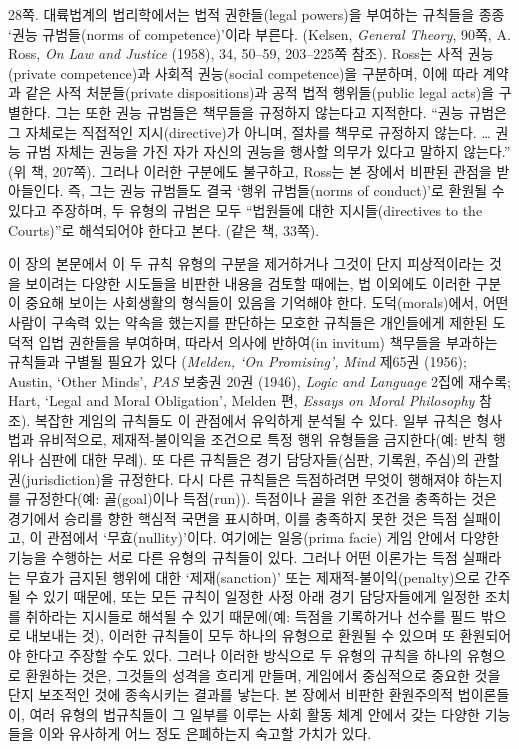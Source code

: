 {\noteentry 28쪽.  대륙법계의
법리학에서는 법적 권한들(legal powers)을 부여하는 규칙들을 종종 ‘권능
규범들(norms of competence)’이라 부른다. (Kelsen, \emph{General Theory},
90쪽, A. Ross, \emph{On Law and Justice} (1958), 34, 50--59, 203--225쪽
참조). Ross는 사적 권능(private competence)과 사회적 권능(social
competence)을 구분하며, 이에 따라 계약과 같은 사적 처분들(private
dispositions)과 공적 법적 행위들(public legal acts)을 구별한다. 그는
또한 권능 규범들은 책무들을 규정하지 않는다고 지적한다. “권능 규범은 그
자체로는 직접적인 지시(directive)가 아니며, 절차를 책무로 규정하지
않는다. \ldots{} 권능 규범 자체는 권능을 가진 자가 자신의 권능을 행사할
의무가 있다고 말하지 않는다.” (위 책, 207쪽). 그러나 이러한 구분에도
불구하고, Ross는 본 장에서 비판된 관점을 받아들인다. 즉, 그는 권능
규범들도 결국 ‘행위 규범들(norms of conduct)’로 환원될 수 있다고
주장하며, 두 유형의 규범은 모두 “법원들에 대한 지시들(directives to the
Courts)”로 해석되어야 한다고 본다. (같은 책, 33쪽).

이 장의 본문에서 이 두 규칙 유형의 구분을 제거하거나 그것이 단지
피상적이라는 것을 보이려는 다양한 시도들을 비판한 내용을 검토할 때에는,
법 이외에도 이러한 구분이 중요해 보이는 사회생활의 형식들이 있음을
기억해야 한다. 도덕(morals)에서, 어떤 사람이 구속력 있는 약속을 했는지를
판단하는 모호한 규칙들은 개인들에게 제한된 도덕적 입법 권한들을
부여하며, 따라서 의사에 반하여(in invitum) 책무들을 부과하는 규칙들과
구별될 필요가 있다 (\emph{Melden, `On Promising',} \emph{Mind} 제65권
(1956); Austin, `Other Minds', \emph{PAS} 보충권 20권 (1946),
\emph{Logic and Language} 2집에 재수록; Hart, `Legal and Moral
Obligation', Melden 편, \emph{Essays on Moral Philosophy} 참조). 복잡한
게임의 규칙들도 이 관점에서 유익하게 분석될 수 있다. 일부 규칙은
형사법과 유비적으로, 제재적-불이익을 조건으로 특정 행위 유형들을
금지한다(예: 반칙 행위나 심판에 대한 무례). 또 다른 규칙들은 경기
담당자들(심판, 기록원, 주심)의 관할권(jurisdiction)을 규정한다. 다시
다른 규칙들은 득점하려면 무엇이 행해져야 하는지를 규정한다(예:
골(goal)이나 득점(run)). 득점이나 골을 위한 조건을 충족하는 것은
경기에서 승리를 향한 핵심적 국면을 표시하며, 이를 충족하지 못한 것은
득점 실패이고, 이 관점에서 ‘무효(nullity)’이다. 여기에는 일응(prima
facie) 게임 안에서 다양한 기능을 수행하는 서로 다른 유형의 규칙들이
있다. 그러나 어떤 이론가는 득점 실패라는 무효가 금지된 행위에 대한
‘제재(sanction)’ 또는 제재적-불이익(penalty)으로 간주될 수 있기 때문에,
또는 모든 규칙이 일정한 사정 아래 경기 담당자들에게 일정한 조치를
취하라는 지시들로 해석될 수 있기 때문에(예: 득점을 기록하거나 선수를
필드 밖으로 내보내는 것), 이러한 규칙들이 모두 하나의 유형으로 환원될 수
있으며 또 환원되어야 한다고 주장할 수도 있다. 그러나 이러한 방식으로 두
유형의 규칙을 하나의 유형으로 환원하는 것은, 그것들의 성격을 흐리게
만들며, 게임에서 중심적으로 중요한 것을 단지 보조적인 것에 종속시키는
결과를 낳는다. 본 장에서 비판한 환원주의적 법이론들이, 여러 유형의
법규칙들이 그 일부를 이루는 사회 활동 체계 안에서 갖는 다양한 기능들을
이와 유사하게 어느 정도 은폐하는지 숙고할 가치가 있다.

}
